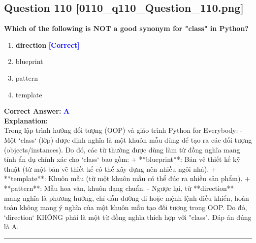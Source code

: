 \documentclass[11pt,a4paper]{article}
\begin{document}
\begin{minipage}{\textwidth}
\subsection*{Question 110 \quad \footnotesize{[0110_q110_Question_110.png]}}
\noindent \textbf{Which of the following is NOT a good synonym for "class" in Python?}

\begin{enumerate}[label=\Alph*.]
    \item \textbf{direction} \hfill \textcolor{blue}{\textbf{[Correct]}}
    \item blueprint
    \item pattern
    \item template
\end{enumerate}

\noindent \textbf{Correct Answer:} \textcolor{blue}{\textbf{A}} \\[4pt]
\noindent \textbf{Explanation:}\\
Trong lập trình hướng đối tượng (OOP) và giáo trình Python for Everybody:\newline
- Một `class` (lớp) được định nghĩa là một khuôn mẫu dùng để tạo ra các đối tượng (objects/instances). Do đó, các từ thường được dùng làm từ đồng nghĩa mang tính ẩn dụ chính xác cho `class` bao gồm:\newline
  + **blueprint**: Bản vẽ thiết kế kỹ thuật (từ một bản vẽ thiết kế có thể xây dựng nên nhiều ngôi nhà).\newline
  + **template**: Khuôn mẫu (từ một khuôn mẫu có thể đúc ra nhiều sản phẩm).\newline
  + **pattern**: Mẫu hoa văn, khuôn dạng chuẩn.\newline
- Ngược lại, từ **direction** mang nghĩa là phương hướng, chỉ dẫn đường đi hoặc mệnh lệnh điều khiển, hoàn toàn không mang ý nghĩa của một khuôn mẫu tạo đối tượng trong OOP.\newline
Do đó, `direction` KHÔNG phải là một từ đồng nghĩa thích hợp với "class". Đáp án đúng là A.
\end{minipage}
\vspace{0.8cm}
\hrule
\vspace{0.5cm}
\end{document}
